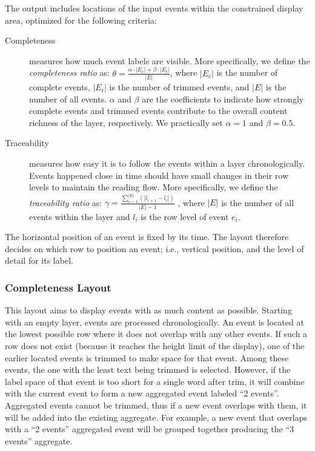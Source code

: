 The output includes locations of the input events within the constrained display area, optimized for the following criteria:
\begin{description}
	\item[Completeness] measures how much event labels are visible. More specifically, we define the \emph{completeness ratio} as:
	$\theta = \frac{\alpha \cdot |E_c| + \beta \cdot |E_t|}{|E|}$, where $|E_c|$ is the number of complete events, $|E_t|$ is the number of trimmed events, and $|E|$ is the number of all events. $\alpha$ and $\beta$ are the coefficients to indicate how strongly complete events and trimmed events contribute to the overall content richness of the layer, respectively. We practically set $\alpha=1$ and $\beta=0.5$.

	\item[Traceability] measures how easy it is to follow the events within a layer chronologically. Events happened close in time should have small changes in their row levels to maintain the reading flow. More specifically, we define the \emph{traceability ratio} as:
	$\gamma=\frac{\sum\limits_{i=1}^{|E|}(|l_{i+1} - l_i|)}{|E|-1}$	, where $|E|$ is the number of all events within the layer and $l_i$ is the row level of event $e_i$.
\end{description}

The horizontal position of an event is fixed by its time. The layout therefore decides on which row to position an event; i.e., vertical position, and the level of detail for its label.

\subsubsection{Completeness Layout}
This layout aims to display events with as much content as possible. Starting with an empty layer, events are processed chronologically. An event is located at the lowest possible row where it does not overlap with any other events. If such a row does not exist (because it reaches the height limit of the display), one of the earlier located events is trimmed to make space for that event. Among these events, the one with the least text being trimmed is selected. However, if the label space of that event is too short for a single word after trim, it will combine with the current event to form a new aggregated event labeled ``2 events''. Aggregated events cannot be trimmed, thus if a new event overlaps with them, it will be added into the existing aggregate. For example, a new event that overlaps with a ``2 events'' aggregated event will be grouped together producing the ``3 events'' aggregate.

